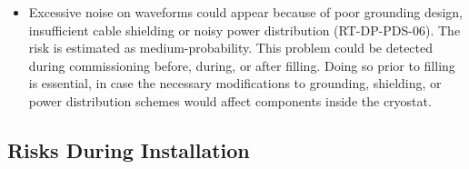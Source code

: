 \begin{itemize}
\item Excessive noise on  waveforms could appear because of poor grounding design, insufficient cable shielding or noisy power distribution (RT-DP-PDS-06). The risk is estimated as medium-probability. This problem could be detected during  commissioning before, during, or after filling. Doing so prior to  filling is essential, in case the necessary modifications to grounding, shielding, or power distribution  schemes would affect components inside the cryostat.

\end{itemize}


\subsection{Risks During Installation}
\label{sec:dp-pds-risks_installation}

